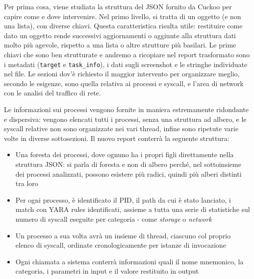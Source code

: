 Per prima cosa, viene studiata la struttura del JSON fornito da Cuckoo per capire come e dove intervenire. Nel primo livello, si tratta di un oggetto (e non una lista), con diverse chiavi. 
Questa caratteristica risulta utile: restituire come dato un oggetto rende successivi aggiornamenti o aggiunte alla struttura dati molto più agevole, rispetto a una lista o altre strutture più basilari.
Le prime chiavi che sono ben strutturate e andremo a ricopiare nel report trasformato sono i metadati (\texttt{target} e \texttt{task\_info}), i dati sugli screenshot e le stringhe individuate nel file.
Le sezioni dov'è richiesto il maggior intervento per organizzare meglio, secondo le esigenze, sono quella relativa ai processi e syscall, e l'area di network con le analisi del traffico di rete.

Le informazioni sui processi vengono fornite in maniera estremamente ridondante e dispersiva: vengono elencati tutti i processi, senza una struttura ad albero, e le syscall relative non sono organizzate nei vari thread, infine sono ripetute varie volte in diverse sottosezioni.
Il nuovo report conterrà la seguente struttura:
\begin{itemize}
    \item Una foresta dei processi, dove ognuno ha i propri figli direttamente nella struttura JSON: si parla di foresta e non di albero perché, nel sottoinsieme dei processi analizzati, possono esistere più radici, quindi più alberi distinti tra loro
    \item Per ogni processo, è identificato il PID, il path da cui è stato lanciato, i match con YARA rules identificati, assieme a tutta una serie di statistiche sul numero di syscall eseguite per categoria - come \emph{storage} o \emph{network}
    \item Un processo a sua volta avrà un insieme di thread, ciascuno col proprio elenco di syscall, ordinate cronologicamente per istanze di invocazione
    \item Ogni chiamata a sistema conterrà informazioni quali il nome mnemonico, la categoria, i parametri in input e il valore restituito in output
\end{itemize}

